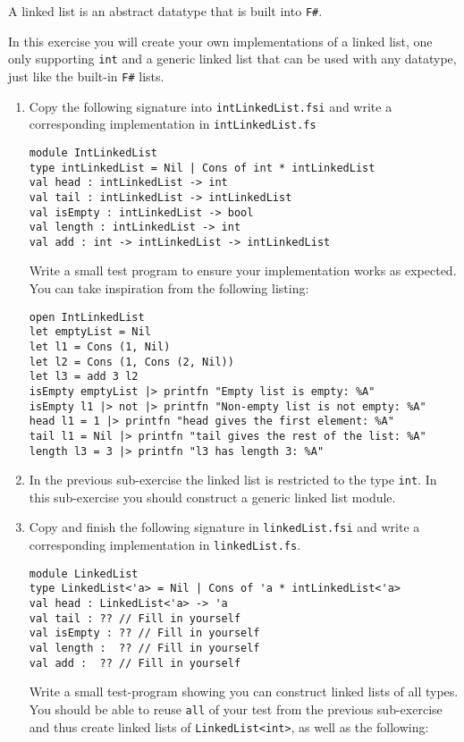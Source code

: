 A linked list is an abstract datatype that is built into \texttt{F\#}.

In this exercise you will create your own implementations of a linked list, one only supporting \texttt{int} and a generic linked list that can be used with any datatype, just like the built-in \texttt{F\#} lists.

\begin{enumerate}
\item Copy the following signature into \texttt{intLinkedList.fsi} and write a corresponding implementation in \texttt{intLinkedList.fs}
  \begin{lstlisting}
module IntLinkedList
type intLinkedList = Nil | Cons of int * intLinkedList
val head : intLinkedList -> int 
val tail : intLinkedList -> intLinkedList
val isEmpty : intLinkedList -> bool
val length : intLinkedList -> int
val add : int -> intLinkedList -> intLinkedList
\end{lstlisting}

Write a small test program to ensure your implementation works as expected.
You can take inspiration from the following listing:
\begin{lstlisting}
open IntLinkedList
let emptyList = Nil
let l1 = Cons (1, Nil)
let l2 = Cons (1, Cons (2, Nil))
let l3 = add 3 l2
isEmpty emptyList |> printfn "Empty list is empty: %A"
isEmpty l1 |> not |> printfn "Non-empty list is not empty: %A"
head l1 = 1 |> printfn "head gives the first element: %A"
tail l1 = Nil |> printfn "tail gives the rest of the list: %A"
length l3 = 3 |> printfn "l3 has length 3: %A"  
\end{lstlisting}

\item
  In the previous sub-exercise the linked list is restricted to the type \texttt{int}.
  In this sub-exercise you should construct a generic linked list module.
  \item Copy and finish the following signature in \texttt{linkedList.fsi} and write a corresponding implementation in \texttt{linkedList.fs}. 
    \begin{lstlisting}
module LinkedList
type LinkedList<'a> = Nil | Cons of 'a * intLinkedList<'a>
val head : LinkedList<'a> -> 'a
val tail : ?? // Fill in yourself
val isEmpty : ?? // Fill in yourself
val length :  ?? // Fill in yourself
val add :  ?? // Fill in yourself
\end{lstlisting}

Write a small test-program showing you can construct linked lists of all types.
You should be able to reuse \texttt{all} of your test from the previous sub-exercise and thus create linked lists of \lstinline{LinkedList<int>}, as well as the following:


\end{enumerate}
